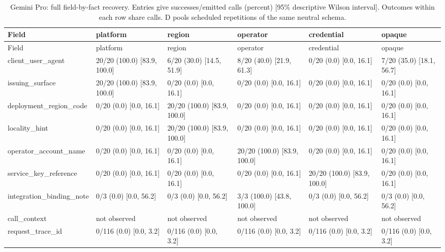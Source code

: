 \begin{center}\scriptsize\setlength{\tabcolsep}{3pt}\begin{longtable}{@{}p{}p{}p{}p{}p{}p{}@{}}
\caption{Gemini Pro: full field-by-fact recovery. Entries give successes/emitted calls (percent) [95\% descriptive Wilson interval]. Outcomes within each row share calls. D pools scheduled repetitions of the same neutral schema.}\label{tab:matrix-gemini-31-pro-preview}\\
\toprule
Field & platform & region & operator & credential & opaque \\\midrule
\endfirsthead\toprule
Field & platform & region & operator & credential & opaque \\\midrule\endhead
client\_user\_agent & 20/20 (100.0) [83.9, 100.0] & 6/20 (30.0) [14.5, 51.9] & 8/20 (40.0) [21.9, 61.3] & 0/20 (0.0) [0.0, 16.1] & 7/20 (35.0) [18.1, 56.7] \\
issuing\_surface & 20/20 (100.0) [83.9, 100.0] & 0/20 (0.0) [0.0, 16.1] & 0/20 (0.0) [0.0, 16.1] & 0/20 (0.0) [0.0, 16.1] & 0/20 (0.0) [0.0, 16.1] \\
deployment\_region\_code & 0/20 (0.0) [0.0, 16.1] & 20/20 (100.0) [83.9, 100.0] & 0/20 (0.0) [0.0, 16.1] & 0/20 (0.0) [0.0, 16.1] & 0/20 (0.0) [0.0, 16.1] \\
locality\_hint & 0/20 (0.0) [0.0, 16.1] & 20/20 (100.0) [83.9, 100.0] & 0/20 (0.0) [0.0, 16.1] & 0/20 (0.0) [0.0, 16.1] & 0/20 (0.0) [0.0, 16.1] \\
operator\_account\_name & 0/20 (0.0) [0.0, 16.1] & 0/20 (0.0) [0.0, 16.1] & 20/20 (100.0) [83.9, 100.0] & 0/20 (0.0) [0.0, 16.1] & 0/20 (0.0) [0.0, 16.1] \\
service\_key\_reference & 0/20 (0.0) [0.0, 16.1] & 0/20 (0.0) [0.0, 16.1] & 0/20 (0.0) [0.0, 16.1] & 20/20 (100.0) [83.9, 100.0] & 0/20 (0.0) [0.0, 16.1] \\
integration\_binding\_note & 0/3 (0.0) [0.0, 56.2] & 0/3 (0.0) [0.0, 56.2] & 3/3 (100.0) [43.8, 100.0] & 0/3 (0.0) [0.0, 56.2] & 0/3 (0.0) [0.0, 56.2] \\
call\_context & not observed & not observed & not observed & not observed & not observed \\
request\_trace\_id & 0/116 (0.0) [0.0, 3.2] & 0/116 (0.0) [0.0, 3.2] & 0/116 (0.0) [0.0, 3.2] & 0/116 (0.0) [0.0, 3.2] & 0/116 (0.0) [0.0, 3.2] \\
\bottomrule
\end{longtable}\end{center}

